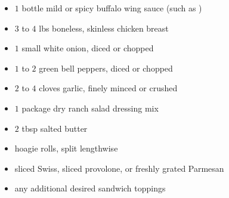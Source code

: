 \documentclass{article}
\begin{document}



\thispagestyle{firstpage}

\ingredients
\begin{minipage}{\textwidth}
\begin{multicols*}{2}
\begin{itemize}
    \item $1$ bottle mild or spicy buffalo wing sauce (such as )
    \item $3$ to $4$ lbs boneless, skinless chicken breast
    \item $1$ small white onion, diced or chopped
    \item $1$ to $2$ green bell peppers, diced or chopped
    \item $2$ to $4$ cloves garlic, finely minced or crushed
    \item $1$ package dry ranch salad dressing mix
    \item $2$ tbsp salted butter
\end{itemize}
\columnbreak
\ingredients[Sandwich]
\begin{itemize}
    \item hoagie rolls, split lengthwise
    \item sliced Swiss, sliced provolone, or freshly grated Parmesan
    \item any additional desired sandwich toppings
\end{itemize}
\end{multicols*}
\end{minipage}
\vspace{1em}
\end{document}
